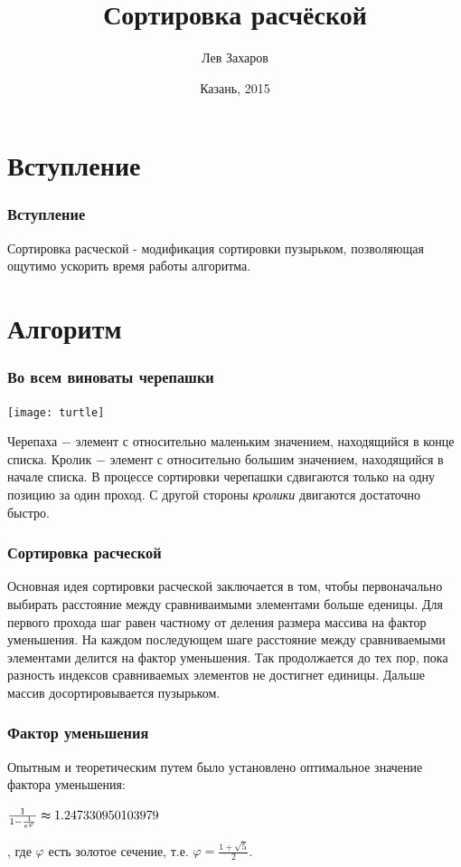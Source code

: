 \documentclass{beamer}
\newcommand{\br}{\pause \linebreak \linebreak}
\newcommand{\nl}{\pause \linebreak}
\begin{document}
\title{Сортировка расчёской}
\author{Лев Захаров}
\date{Казань, 2015}
\frame{\titlepage}

\section{Вступление}
\begin{frame}
    \frametitle{Вступление}
    	\alert{Сортировка расческой} - модификация сортировки пузырьком, позволяющая ощутимо ускорить время работы алгоритма.
\end{frame}

\section{Алгоритм}
\begin{frame}
    \frametitle{Во всем виноваты черепашки}
	 \center\texttt{[image: turtle]}
\end{frame}

\begin{frame}
   	\alert{Черепаха} $-$ элемент с относительно маленьким значением, находящийся в конце списка.
        \nl
        \alert{Кролик} $-$ элемент с относительно большим значением, находящийся в начале списка.
        \br
        В процессе сортировки черепашки сдвигаются только на одну позицию за один проход. С другой стороны \textit{кролики} двигаются достаточно быстро.
\end{frame}

\begin{frame}
    \frametitle{Сортировка расческой}
    Основная идея сортировки расческой заключается в том, чтобы первоначально выбирать расстояние между сравниваимыми элементами больше еденицы.
    \br
    Для первого прохода шаг равен частному от деления размера массива на \alert{фактор уменьшения}.
    \nl
    На каждом последующем шаге расстояние между сравниваемыми элементами делится на \alert{фактор уменьшения}.
    \br
    Так продолжается до тех пор, пока разность индексов сравниваемых элементов не достигнет единицы.
    Дальше массив досортировывается пузырьком.
\end{frame}

\begin{frame}
    \frametitle{Фактор уменьшения}
    Опытным и теоретическим путем было установлено оптимальное значение \alert{фактора уменьшения}:
    \begin{center}
        \Large $\frac{1}{1 - \frac1{e^{\varphi}}} \thickapprox 1.247330950103979$
    \end{center}
    , где $\varphi$ есть золотое сечение, т.е. $\varphi = \frac{1 + \sqrt{5}}2$.
\end{frame}
\end{document}
